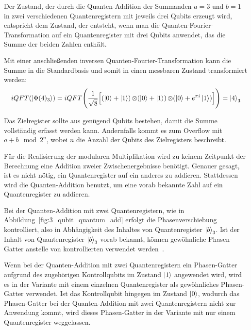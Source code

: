 Der Zustand, 
der durch die Quanten-Addition der Summanden \(a=3\) und 
\(b=1\) in zwei verschiedenen Quantenregistern mit jeweils drei Qubits erzeugt wird, 
entspricht dem Zustand, der entsteht, 
wenn man die Quanten-Fourier-Transformation auf ein Quantenregister mit drei Qubits anwendet, 
das die Summe der beiden Zahlen enthält.

Mit einer anschließenden inversen Quanten-Fourier-Transformation 
kann die Summe in die Standardbasis und somit in einen messbaren Zustand transformiert werden:
\[
iQFT(\ket{\Phi(4)_3})
=
 iQFT \Bigg(\frac{1}{\sqrt{8}} \Big[ (\ket{0} + \ket{1} ) \operatorname{\otimes}
( \ket{0} +   \ket{1} ) \operatorname{\otimes}
( \ket{0} +  e^{\pi i }\ket{1} ) \Big]\Bigg) 
=
\ket{4}_3
\]

Das Zielregister sollte aus genügend Qubits bestehen, 
damit die Summe vollständig erfasst werden kann.
Andernfalls kommt es zum Overflow mit \(a + b \mod 2^n\), 
wobei \(n\) die Anzahl der Qubits des Zielregisters beschreibt.

Für die Realisierung der modularen Multiplikation wird zu keinem Zeitpunkt der Berechnung eine Addition zweier Zwischenergebnisse benötigt. 
Genauer gesagt, ist es nicht nötig, ein Quantenregister auf ein anderes zu addieren. 
Stattdessen wird die Quanten-Addition benutzt, um eine vorab bekannte Zahl auf ein Quantenregister zu addieren.

Bei der Quanten-Addition mit zwei Quantenregistern, 
wie in Abbildung~\ref{fig:3_qubit_quantum_add} erfolgt die Phasenverschiebung kontrolliert,  
also in Abhängigkeit des Inhaltes von Quantenregister \(\ket{b}_3\).
Ist der Inhalt von Quantenregister \(\ket{b}_3\) vorab bekannt,
können gewöhnliche Phasen-Gatter anstelle von kontrollierten verwendet werden~\cite{beauregard2003circuit}.

Wenn bei der Quanten-Addition mit zwei Quantenregistern ein Phasen-Gatter aufgrund des zugehörigen Kontrollqubits im Zustand \(\ket{1}\) angewendet wird,
wird es in der Variante mit einem einzelnen Quantenregister als gewöhnliches Phasen-Gatter verwendet.
Ist das Kontrollqubit hingegen im Zustand \(\ket{0}\), 
wodurch das Phasen-Gatter bei der Quanten-Addition mit zwei Quantenregistern nicht zur Anwendung kommt, 
wird dieses Phasen-Gatter in der Variante mit nur einem Quantenregister weggelassen.

